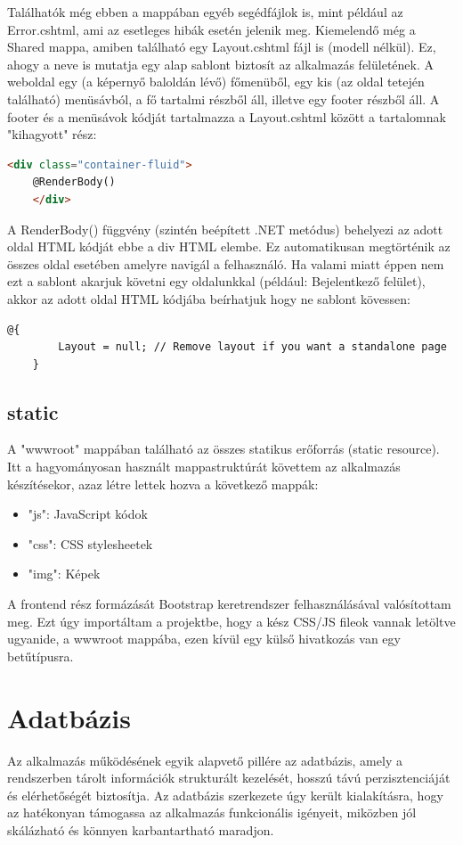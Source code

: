 Találhatók még ebben a mappában egyéb segédfájlok is, mint például az Error.cshtml, ami az esetleges hibák esetén jelenik meg. Kiemelendő még a Shared mappa, amiben található egy Layout.cshtml fájl is (modell nélkül). Ez, ahogy a neve is mutatja egy alap sablont biztosít az alkalmazás felületének. A weboldal egy (a képernyő baloldán lévő) főmenüből, egy kis (az oldal tetején található) menüsávból, a fő tartalmi részből áll, illetve egy footer részből áll. A footer és a menüsávok kódját tartalmazza a Layout.cshtml között a tartalomnak "kihagyott" rész: 
\begin{lstlisting}[language={HTML}]
	<div class="container-fluid">
	@RenderBody()
	</div>
\end{lstlisting}

A RenderBody() függvény (szintén beépített .NET metódus)
behelyezi az adott oldal HTML kódját ebbe a div HTML elembe. Ez
automatikusan megtörténik az összes oldal esetében amelyre
navigál a felhasználó. Ha valami miatt éppen nem ezt a sablont akarjuk követni egy oldalunkkal (például: Bejelentkező felület), akkor az adott oldal HTML kódjába beírhatjuk hogy ne sablont kövessen:

\begin{lstlisting}[language={[Sharp]C}]
	@{
		Layout = null; // Remove layout if you want a standalone page
	}
\end{lstlisting}

\subsection{static}
A "wwwroot" mappában található az összes statikus erőforrás (static resource). Itt a hagyományosan használt mappastruktúrát követtem az alkalmazás készítésekor, azaz létre lettek hozva a következő mappák:
\begin{itemize}
	\item "js": JavaScript kódok
	\item "css": CSS stylesheetek
	\item "img": Képek  
\end{itemize}
A frontend rész formázását Bootstrap keretrendszer felhasználásával valósítottam meg. Ezt úgy importáltam a projektbe, hogy a kész CSS/JS fileok vannak letöltve ugyanide, a wwwroot mappába, ezen kívül egy külső hivatkozás van egy betűtípusra. 

\section{Adatbázis}
Az alkalmazás működésének egyik alapvető pillére az adatbázis, amely a rendszerben tárolt információk strukturált kezelését, hosszú távú perzisztenciáját és elérhetőségét biztosítja. Az adatbázis szerkezete úgy került kialakításra, hogy az hatékonyan támogassa az alkalmazás funkcionális igényeit, miközben jól skálázható és könnyen karbantartható maradjon.

